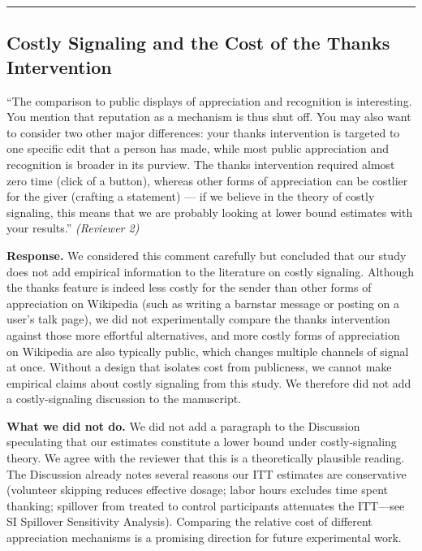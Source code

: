 \documentclass[12pt]{article}
\newenvironment{reviewquote}{%
  \def\FrameCommand{{\color{quotebarcolor}\vrule width 2pt}\colorbox{quotebg}}%
  \MakeFramed{\advance\hsize-\width \FrameRestore}%
  \small
}{%
  \endMakeFramed
}
\begin{document}
\bigskip\hrule\bigskip

\subsection{Costly Signaling and the Cost of the Thanks Intervention}

\begin{reviewquote}
``The comparison to public displays of appreciation and recognition is interesting. You mention that reputation as a mechanism is thus shut off. You may also want to consider two other major differences: your thanks intervention is targeted to one specific edit that a person has made, while most public appreciation and recognition is broader in its purview. The thanks intervention required almost zero time (click of a button), whereas other forms of appreciation can be costlier for the giver (crafting a statement) --- if we believe in the theory of costly signaling, this means that we are probably looking at lower bound estimates with your results.'' \textit{(Reviewer 2)}
\end{reviewquote}

\textbf{Response.} We considered this comment carefully but concluded that our study does not add empirical information to the literature on costly signaling. Although the thanks feature is indeed less costly for the sender than other forms of appreciation on Wikipedia (such as writing a barnstar message or posting on a user's talk page), we did not experimentally compare the thanks intervention against those more effortful alternatives, and more costly forms of appreciation on Wikipedia are also typically public, which changes multiple channels of signal at once. Without a design that isolates cost from publicness, we cannot make empirical claims about costly signaling from this study. We therefore did not add a costly-signaling discussion to the manuscript.

\textbf{What we did not do.} We did not add a paragraph to the Discussion speculating that our estimates constitute a lower bound under costly-signaling theory. We agree with the reviewer that this is a theoretically plausible reading. The Discussion already notes several reasons our ITT estimates are conservative (volunteer skipping reduces effective dosage; labor hours excludes time spent thanking; spillover from treated to control participants attenuates the ITT---see SI Spillover Sensitivity Analysis). Comparing the relative cost of different appreciation mechanisms is a promising direction for future experimental work.
\end{document}
